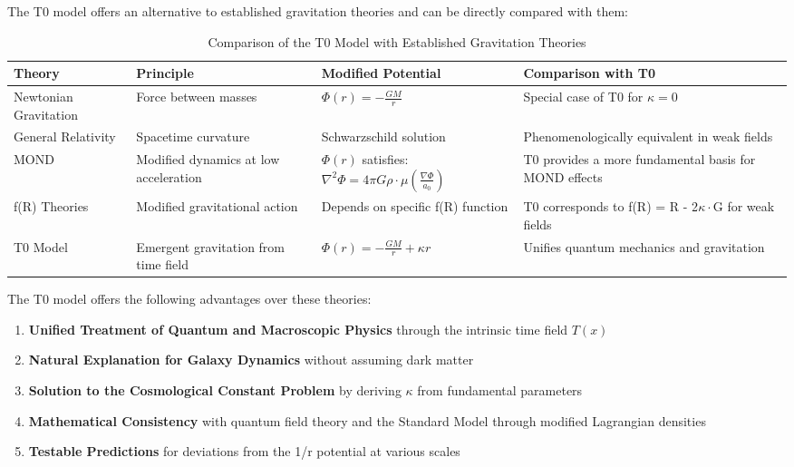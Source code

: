 \documentclass[12pt,a4paper]{article}
\begin{document}
	The T0 model offers an alternative to established gravitation theories and can be directly compared with them:
	
	\begin{table}[H]
		\centering
		\begin{tabular}{p{3cm}p{3cm}p{4cm}p{4cm}}
			\toprule
			\textbf{Theory} & \textbf{Principle} & \textbf{Modified Potential} & \textbf{Comparison with T0} \\
			\midrule
			Newtonian Gravitation & Force between masses & $\Phi(r) = -\frac{GM}{r}$ & Special case of T0 for $\kappa=0$ \\
			General Relativity & Spacetime curvature & Schwarzschild solution & Phenomenologically equivalent in weak fields \\
			MOND & Modified dynamics at low acceleration & $\Phi(r)$ satisfies: $\nabla^2\Phi = 4\pi G\rho\cdot\mu(\frac{\nabla\Phi}{a_0})$ & T0 provides a more fundamental basis for MOND effects \\
			f(R) Theories & Modified gravitational action & Depends on specific f(R) function & T0 corresponds to f(R) = R - 2$\kappa\cdot$G for weak fields \\
			T0 Model & Emergent gravitation from time field & $\Phi(r) = -\frac{GM}{r} + \kappa r$ & Unifies quantum mechanics and gravitation \\
			\bottomrule
		\end{tabular}
		\caption{Comparison of the T0 Model with Established Gravitation Theories}
		\label{tab:theory_comparison}
	\end{table}
	
	The T0 model offers the following advantages over these theories:
	
	\begin{enumerate}
		\item \textbf{Unified Treatment of Quantum and Macroscopic Physics} through the intrinsic time field $T(x)$
		\item \textbf{Natural Explanation for Galaxy Dynamics} without assuming dark matter
		\item \textbf{Solution to the Cosmological Constant Problem} by deriving $\kappa$ from fundamental parameters
		\item \textbf{Mathematical Consistency} with quantum field theory and the Standard Model through modified Lagrangian densities
		\item \textbf{Testable Predictions} for deviations from the 1/r potential at various scales
	\end{enumerate}
	
\end{document}
